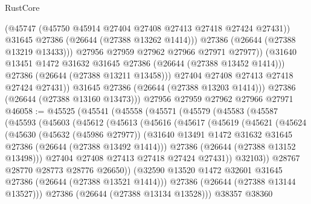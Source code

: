 \begin{lexlean}{RustCore}
\begin{coremodule}
                      (@45747 (@45750 @45914 @27404 @27408 @27413 @27418 @27424 @27431))
                      @31645
                      @27386
                      (@26644 (@27388 @13262 @1414)))
                    @27386
                    (@26644 (@27388 @13219 @13433)))
                  @27956
                  @27959
                  @27962
                  @27966
                  @27971
                  @27977))
              (@31640 @13451 @1472 @31632 @31645 @27386 (@26644 (@27388 @13452 @1414)))
              @27386
              (@26644 (@27388 @13211 @13458)))
            @27404
            @27408
            @27413
            @27418
            @27424
            @27431))
        @31645
        @27386
        (@26644 (@27388 @13203 @1414)))
      @27386
      (@26644 (@27388 @13160 @13473)))
    @27956
    @27959
    @27962
    @27966
    @27971
@46058 := @45525
    (@45541
      (@45558
        (@45571
          (@45579
            (@45583
              (@45587
                (@45593
                  (@45603
                    (@45612
                      (@45613
                        (@45616
                          (@45617
                            (@45619
                              (@45621
                                (@45624
                                  (@45630
                                    (@45632 (@45986 @27977))
                                    (@31640
                                      @13491
                                      @1472
                                      @31632
                                      @31645
                                      @27386
                                      (@26644 (@27388 @13492 @1414)))
                                    @27386
                                    (@26644 (@27388 @13152 @13498)))
                                  @27404
                                  @27408
                                  @27413
                                  @27418
                                  @27424
                                  @27431))
                              @32103))
                          @28767
                          @28770
                          @28773
                          @28776
                          @26650))
                      (@32590 @13520 @1472 @32601 @31645 @27386 (@26644 (@27388 @13521 @1414)))
                      @27386
                      (@26644 (@27388 @13144 @13527)))
                    @27386
                    (@26644 (@27388 @13134 @13528)))
                  @38357
                  @38360

\end{coremodule}
\end{lexlean}
